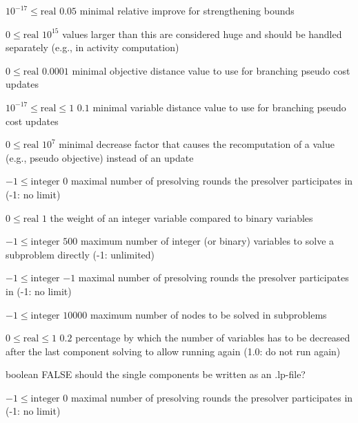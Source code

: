 %
{$10^{-17}\leq\textrm{real}$}%
{$0.05$}%
{minimal relative improve for strengthening bounds}%
{}

%
{$0\leq\textrm{real}$}%
{$10^{ 15}$}%
{values larger than this are considered huge and should be handled separately (e.g., in activity computation)}%
{}

%
{$0\leq\textrm{real}$}%
{$0.0001$}%
{minimal objective distance value to use for branching pseudo cost updates}%
{}

%
{$10^{-17}\leq\textrm{real}\leq1$}%
{$0.1$}%
{minimal variable distance value to use for branching pseudo cost updates}%
{}

%
{$0\leq\textrm{real}$}%
{$10^{  7}$}%
{minimal decrease factor that causes the recomputation of a value (e.g., pseudo objective) instead of an update}%
{}

%
{$-1\leq\textrm{integer}$}%
{$0$}%
{maximal number of presolving rounds the presolver participates in (-1: no limit)}%
{}

%
{$0\leq\textrm{real}$}%
{$1$}%
{the weight of an integer variable compared to binary variables}%
{}

%
{$-1\leq\textrm{integer}$}%
{$500$}%
{maximum number of integer (or binary) variables to solve a subproblem directly (-1: unlimited)}%
{}

%
{$-1\leq\textrm{integer}$}%
{$-1$}%
{maximal number of presolving rounds the presolver participates in (-1: no limit)}%
{}

%
{$-1\leq\textrm{integer}$}%
{$10000$}%
{maximum number of nodes to be solved in subproblems}%
{}

%
{$0\leq\textrm{real}\leq1$}%
{$0.2$}%
{percentage by which the number of variables has to be decreased after the last component solving to allow running again (1.0: do not run again)}%
{}

%
{boolean}%
{FALSE}%
{should the single components be written as an .lp-file?}%
{}

%
{$-1\leq\textrm{integer}$}%
{$0$}%
{maximal number of presolving rounds the presolver participates in (-1: no limit)}%
{}

